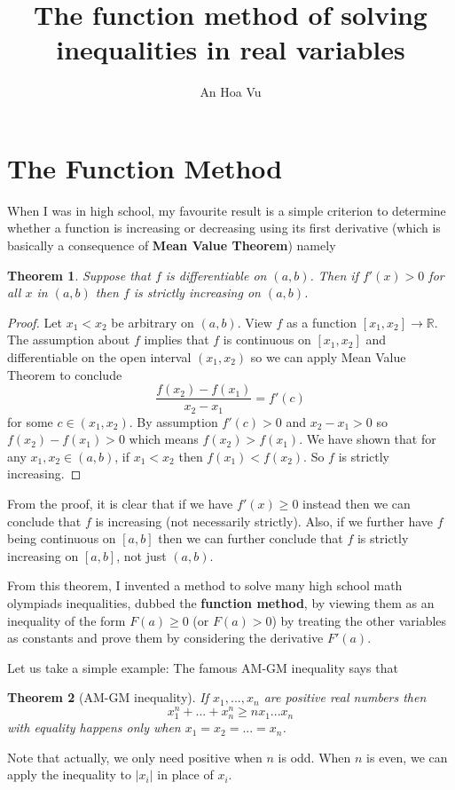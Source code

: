 \documentclass[10pt]{amsart}
\title{The function method of solving inequalities in real variables}
\author{An Hoa Vu}
\newtheorem{thm}{Theorem}
\begin{document}
\maketitle

\section{The Function Method}

When I was in high school, my favourite result is a simple criterion to determine whether a function is increasing or decreasing using its first derivative (which is basically a consequence of \textbf{Mean Value Theorem}) namely

\begin{thm}
Suppose that $f$ is differentiable on $(a, b)$. Then if $f'(x) > 0$ for all $x$ in $(a, b)$ then $f$ is strictly increasing on $(a, b)$.
\end{thm}
\begin{proof}
Let $x_1 < x_2$ be arbitrary on $(a, b)$. View $f$ as a function $[x_1, x_2] \rightarrow \mathbb{R}$. The assumption about $f$ implies that $f$ is continuous on $[x_1, x_2]$ and differentiable on the open interval $(x_1, x_2)$ so we can apply Mean Value Theorem to conclude
$$\frac{f(x_2) - f(x_1)}{x_2 - x_1} = f'(c)$$
for some $c \in (x_1, x_2)$. By assumption $f'(c) > 0$ and $x_2 - x_1 > 0$ so $f(x_2) - f(x_1) > 0$ which means $f(x_2) > f(x_1)$. We have shown that for any $x_1, x_2 \in (a, b)$, if $x_1 < x_2$ then $f(x_1) < f(x_2)$. So $f$ is strictly increasing.
\end{proof}

From the proof, it is clear that if we have $f'(x) \geq 0$ instead then we can conclude that $f$ is increasing (not necessarily strictly). Also, if we further have $f$ being continuous on $[a, b]$ then we can further conclude that $f$ is strictly increasing on $[a, b]$, not just $(a, b)$.

From this theorem, I invented a method to solve many high school math olympiads inequalities, dubbed the \textbf{function method}, by viewing them as an inequality of the form $F(a) \geq 0$ (or $F(a) > 0$) by treating the other variables as constants and prove them by considering the derivative $F'(a)$.

Let us take a simple example: The famous AM-GM inequality says that
\begin{thm}[AM-GM inequality]
If $x_1, ..., x_n$ are positive real numbers then
$$x_1^n + ... + x_n^n \geq n x_1 ... x_n$$
with equality happens only when $x_1 = x_2 = ... = x_n$.
\end{thm}
Note that actually, we only need positive when $n$ is odd. When $n$ is even, we can apply the inequality to $|x_i|$ in place of $x_i$.
\end{document}
